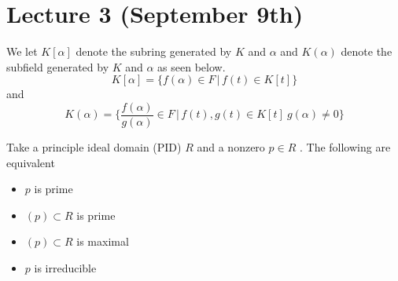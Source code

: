 \section{Lecture 3 (September 9th)}
\begin{defi}
We let $K[\alpha ]$ denote the subring generated by $K$ and $\alpha $ and $K(\alpha )$ denote the subfield generated by $K$ and $\alpha $ as seen  below.
\[K[\alpha ]=\{f(\alpha )\in F \,|\, f(t)\in K[t]\}\]
and
\[K(\alpha )=\Big\{\dfrac{f(\alpha )}{g(\alpha )}\in F \,|\, f(t),g(t)\in K[t]\ g(\alpha )\ne 0\Big\}\]
\end{defi}
\vspace{2ex}
\begin{recall}
Take a principle ideal domain (PID) $R$ and a nonzero $p\in R$ . The following are equivalent
\begin{itemize}
	\item[(i)] $p$ is prime
	\item[(ii)] $(p)\subset R$ is prime
	\item[(iii)] $(p)\subset R$ is maximal
	\item[(iv)] $p$ is irreducible
\end{itemize}

\end{recall}
\vspace{2ex}
